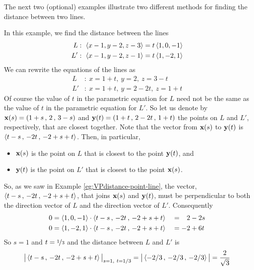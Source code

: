 The next two (optional) examples illustrate two different methods for finding the distance between two lines.
\begin{eg}[Optional]\label{eg:VPdistance-line-line}
In this example, we find the distance between the lines
\begin{align*}
L&:\  \left< x-1,y-2,z-3\right> = t \left< 1,0,-1 \right> \\
L'&:\ \left< x-1,y-2,z-1\right> = t \left< 1,-2,1 \right> 
\end{align*}
We can rewrite the equations of the lines as
\begin{align*}
L&:\  x=1+t,\ y=2,\ z=3-t \\
L'&:\ x=1+t,\ y=2-2t,\ z=1+t 
\end{align*}
Of course the value of $t$ in the parametric equation for $L$ need not be 
the same as the value of $t$ in the parametric equation for $L'$. So 
let us denote by $\mathbf{x}(s) = (1+s\,,\,2\,,\,3-s)$ and 
$\mathbf{y}(t) = (1+t\,,\,2-2t\,,\,1+t)$ 
the points on $L$ and $L'$, respectively, that are closest together. 
Note that the vector from $\mathbf{x}(s)$ to $\mathbf{y}(t)$ is
$\left<  t-s\,,\,-2t\,,\,-2+s+t \right>$. Then, in particular,
\begin{itemize}\itemsep1pt \parskip0pt 
\item
$\mathbf{x}(s)$ is the point on $L$ that is closest to the point $\mathbf{y}(t)$, and
\item
$\mathbf{y}(t)$ is the point on $L'$ that is closest to the point $\mathbf{x}(s)$.
\end{itemize}
So, as we saw in Example \ref{eg:VPdistance-point-line},
the vector, $\left<  t-s\,,\,-2t\,,\,-2+s+t \right>$, that joins $\mathbf{x}(s)$ and $\mathbf{y}(t)$, must be perpendicular to both the direction vector of $L$ and the
direction vector of $L'$. Consequently
\begin{alignat*}{3}
0&= \left< 1,0,-1\right>\cdot\left<  t-s\,,\,-2t\,,\,-2+s+t \right>
 &&= \phantom{-}2-2s
\\
0&= \left< 1,-2,1\right>\cdot\left<  t-s\,,\,-2t\,,\,-2+s+t \right>
 &&=-2+6t
\end{alignat*}
So $s=1$ and $t=\nicefrac{1}{3}$ and the distance between $L$ and $L'$ is
\begin{align*}
\big|\left<  t-s\,,\,-2t\,,\,-2+s+t \right>\big|_{s=1,\ t=1/3}
=\big|\left< -2/3\,,\,-2/3\,,\,-2/3 \right>\big|
=\frac{2}{\sqrt{3}}
\end{align*}

\end{eg}


